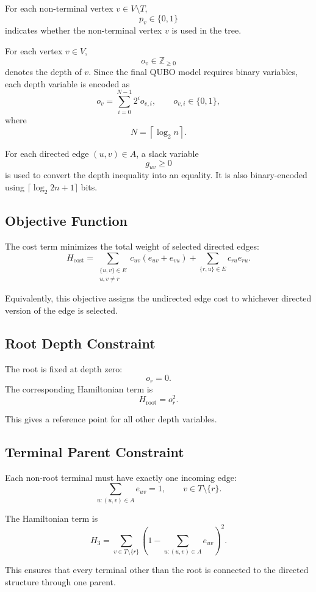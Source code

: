 \documentclass[a4paper,12pt]{report}
\begin{document}
For each non-terminal vertex \(v\in V\setminus T\),
\[
p_v\in\{0,1\}
\]
indicates whether the non-terminal vertex \(v\) is used in the tree.

For each vertex \(v\in V\),
\[
o_v\in\mathbb{Z}_{\ge 0}
\]
denotes the depth of \(v\). Since the final QUBO model requires binary variables, each depth variable is encoded as
\[
o_v
=
\sum_{i=0}^{N-1}2^i o_{v,i},
\qquad
o_{v,i}\in\{0,1\},
\]
where
\[
N=\left\lceil \log_2 n \right\rceil.
\]

For each directed edge \((u,v)\in A\), a slack variable
\[
g_{uv}\ge 0
\]
is used to convert the depth inequality into an equality. It is also binary-encoded using \(\lceil\log_2{2n+1}\rceil\) bits.

\subsection{Objective Function}

The cost term minimizes the total weight of selected directed edges:
\[
H_{\text{cost}}
=
\sum_{\substack{\{u,v\}\in E\\u,v\neq r}}
c_{uv}(e_{uv}+e_{vu})
+
\sum_{\{r,u\}\in E}
c_{ru}e_{ru}.
\]

Equivalently, this objective assigns the undirected edge cost to whichever directed version of the edge is selected.

\subsection{Root Depth Constraint}

The root is fixed at depth zero:
\[
o_r=0.
\]
The corresponding Hamiltonian term is
\[
H_{\text{root}}
=
o_r^2.
\]

This gives a reference point for all other depth variables.

\subsection{Terminal Parent Constraint}

Each non-root terminal must have exactly one incoming edge:
\[
\sum_{u:(u,v)\in A} e_{uv}=1,
\qquad
v\in T\setminus\{r\}.
\]

The Hamiltonian term is
\[
H_3
=
\sum_{v\in T\setminus\{r\}}
\left(
1-\sum_{u:(u,v)\in A}e_{uv}
\right)^2.
\]

This ensures that every terminal other than the root is connected to the directed structure through one parent.
\end{document}
